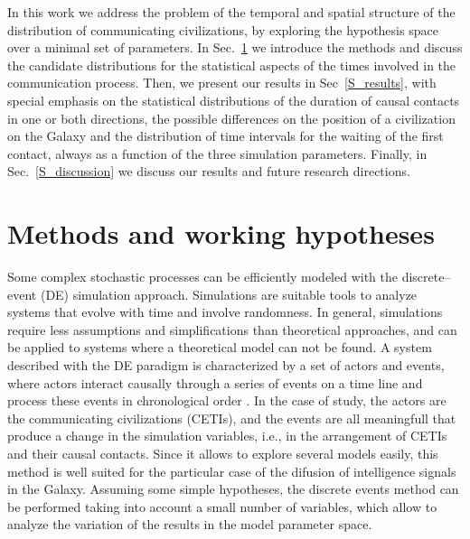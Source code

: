 \documentclass[crop]{CSLB}%
\begin{document}
In this work we address the problem of the temporal and spatial
structure of the distribution of communicating civilizations, by
exploring the hypothesis space over a minimal set of parameters.
%
In Sec.~\ref{S_methods} we introduce the methods and discuss the
candidate distributions for the statistical aspects of the times
involved in the communication process.
%
Then, we present our results in Sec~\ref{S_results}, with special
emphasis on the statistical distributions of the duration of causal
contacts in one or both directions, the possible differences on the
position of a civilization on the Galaxy and the distribution of time
intervals for the waiting of the first contact, always as a function
of the three simulation parameters.
%
Finally, in Sec.~\ref{S_discussion} we discuss our results and future
research directions.




\section{Methods and working hypotheses}\label{S_methods}


Some complex stochastic processes can be efficiently modeled with the
discrete--event (DE) simulation approach.
%
Simulations are suitable tools to analyze systems that evolve with
time and involve randomness.
%
In general, simulations require less assumptions and simplifications
than theoretical approaches, and can be applied to systems where a
theoretical model can not be found.
%
A system described with the DE paradigm is characterized by a set of
actors and events, where actors interact causally through a series of
events on a time line and process these events in chronological order
\citep{ptolemaeus_system_2014, chung_simulation_2003,
simulation_ross_2012}.
%
In the case of study, the actors are the communicating civilizations
(CETIs), and the events are all meaningfull that produce a change in
the simulation variables, i.e., in the arrangement of CETIs and their
causal contacts.
%
Since it allows to explore several models easily, 
this method is well suited for the particular case of the difusion of
intelligence signals in the Galaxy.
%
Assuming some simple hypotheses, the discrete events method can be
performed taking into account a small number of variables, which
allow to analyze the variation of the results in the model parameter space.
\end{document}
